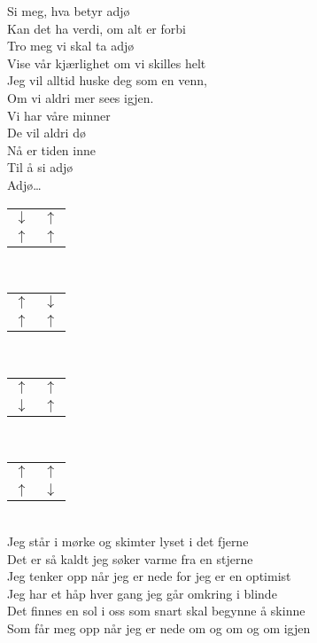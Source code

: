 \documentclass{article}
\begin{document}
\noindent Si meg, hva betyr adjø\\
Kan det ha verdi, om alt er forbi\\
Tro meg vi skal ta adjø\\
Vise vår kjærlighet om vi skilles helt\\
Jeg vil alltid huske deg som en venn,\\
Om vi aldri mer sees igjen.\\


\noindent Vi har våre minner\\
De vil aldri dø\\
Nå er tiden inne\\
Til å si adjø\\
Adjø…\\


\begin{tabular}{c c}
  $\downarrow$ & $\uparrow$\\
  $\uparrow$ & $\uparrow$
\end{tabular}\\

\begin{tabular}{c c}
  $\uparrow$ & $\downarrow$\\
  $\uparrow$ & $\uparrow$
\end{tabular}\\

\begin{tabular}{c c}
  $\uparrow$ & $\uparrow$\\
  $\downarrow$ & $\uparrow$
\end{tabular}\\

\begin{tabular}{c c}
  $\uparrow$ & $\uparrow$\\
  $\uparrow$ & $\downarrow$
\end{tabular}\\

Jeg står i mørke og skimter lyset i det fjerne\\
Det er så kaldt jeg søker varme fra en stjerne\\
Jeg tenker opp når jeg er nede for jeg er en optimist\\


Jeg har et håp hver gang jeg går omkring i blinde\\
Det finnes en sol i oss som snart skal begynne å skinne\\
Som får meg opp når jeg er nede om og om og om igjen\\
\end{document}
